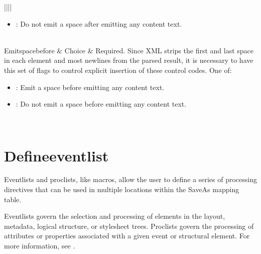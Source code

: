 \documentclass[letterpaper,12pt,english,openany,oneside]{sphinxmanual}
\begin{document}
\begin{savenotes}
\begin{tabular}[t]{||||}
\begin{itemize}
\item {} 
: Do not emit a space after emitting any content text.

\end{itemize}
\\
\hline
Emit\sphinxhyphen{}space\sphinxhyphen{}before
&
Choice
&
Required. Since XML strips the first and last space in each element and most newlines from the parsed result, it is necessary to have this set of flags to control explicit insertion of these control codes. One of:
\begin{itemize}
\item {} 
: Emit a space before emitting any content text.

\item {} 
: Do not emit a space before emitting any content text.

\end{itemize}
\\
\hline
\end{tabular}
\par
\sphinxattableend\end{savenotes}


\section{Define\sphinxhyphen{}event\sphinxhyphen{}list}
\label{\detokenize{SaveAsXML_DirectivesRef:define-event-list}}
Event\sphinxhyphen{}lists and proc\sphinxhyphen{}lists, like macros, allow the user to define a series of processing directives that can be used in multiple locations within the SaveAs mapping table.

Event\sphinxhyphen{}lists govern the selection and processing of elements in the layout, metadata, logical structure, or stylesheet trees. Proc\sphinxhyphen{}lists govern the processing of attributes or properties associated with a given event or structural element. For more information, see .

\label{\detokenize{SaveAsXML_DirectivesRef:dtd-content-rule-6}}

\begin{sphinxVerbatim}[commandchars=\\\{\}]
     
\end{sphinxVerbatim}
\label{\detokenize{SaveAsXML_DirectivesRef:attributes-5}}
\end{document}
